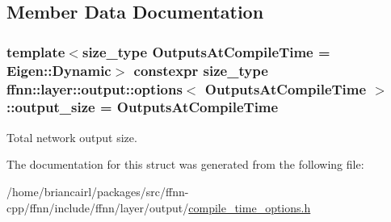 \subsection{Member Data Documentation}
\hypertarget{structffnn_1_1layer_1_1output_1_1options_a8aa6cec799240a3620701c6b4baaef02}{
\subsubsection[{output\-\_\-size}]{\setlength{\rightskip}{0pt plus 5cm}template$<$size\-\_\-type Outputs\-At\-Compile\-Time = Eigen\-::\-Dynamic$>$ constexpr {\bf size\-\_\-type} {\bf ffnn\-::layer\-::output\-::options}$<$ Outputs\-At\-Compile\-Time $>$\-::output\-\_\-size = Outputs\-At\-Compile\-Time\hspace{0.3cm}{\ttfamily [static]}}}\label{structffnn_1_1layer_1_1output_1_1options_a8aa6cec799240a3620701c6b4baaef02}


Total network output size. 



The documentation for this struct was generated from the following file\-:\begin{DoxyCompactItemize}
\item 
/home/briancairl/packages/src/ffnn-\/cpp/ffnn/include/ffnn/layer/output/\hyperlink{output_2compile__time__options_8h}{compile\-\_\-time\-\_\-options.\-h}\end{DoxyCompactItemize}
